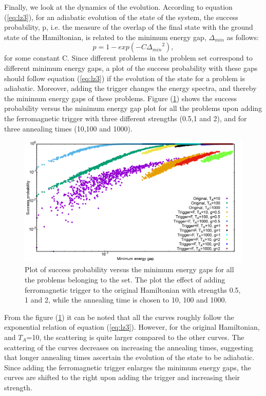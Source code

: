 \documentclass[../main.tex]{subfiles}
\begin{document}
Finally, we look at the dynamics of the evolution. According to equation (\ref{eq:lz3}), for an adiabatic evolution of the state of the system, the success probability, p, i.e. the measure of the overlap of the final state with the ground state of the Hamiltonian, is related to the minimum energy gap, $\Delta_{min}$ as follows:
\begin{equation}
p=1-exp(-C{\Delta_{min}}^2),
\end{equation}
for some constant C. Since different problems in the problem set correspond to different minimum energy gaps, a plot of the success probability with these gaps should follow equation (\ref{eq:lz3}) if the evolution of the state for a problem is adiabatic. Moreover, adding the trigger changes the energy spectra, and thereby the minimum energy gaps of these problems. Figure (\ref{fig:f14}) shows the success probability versus the minimum energy gap plot for all the problems upon adding the ferromagnetic trigger with three different strengths (0.5,1 and 2), and for three annealing times (10,100 and 1000).

\begin{figure}[H]
\centering
\includegraphics[scale=0.3]{SuccVsGap_OF_g.png}
\caption{Plot of success probability versus the minimum energy gaps for all the problems belonging to the set. The plot the effect of adding ferromagnetic trigger to the original Hamiltonian with strengths 0.5, 1 and 2, while the annealing time is chosen to 10, 100 and 1000.}
\label{fig:f14}
\end{figure} 

From the figure (\ref{fig:f14}) it can be noted that all the curves roughly follow the exponential  relation of equation (\ref{eq:lz3}). However, for the original Hamiltonian, and $T_A$=10, the scattering is quite larger compared to the other curves. The scattering of the curves decreases on increasing the annealing times, suggesting that longer annealing times ascertain the evolution of the state to be adiabatic. Since adding the ferromagnetic trigger enlarges the minimum energy gaps, the curves are shifted to the right upon adding the trigger and increasing their strength. 
\end{document}
